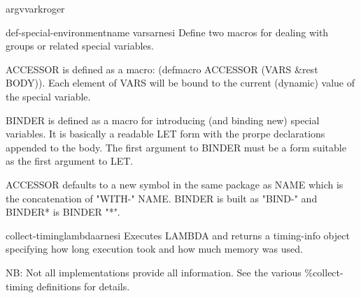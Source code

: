 \begin{function}{argv}{var}{kroger}{}
  
\end{function}

\begin{macro}{def-special-environment}{name \key \rest vars}{arnesi}{}
  Define two macros for dealing with groups or related special variables.

ACCESSOR is defined as a macro: (defmacro ACCESSOR (VARS \&rest
BODY)).  Each element of VARS will be bound to the
current (dynamic) value of the special variable.

BINDER is defined as a macro for introducing (and binding new)
special variables. It is basically a readable LET form with the
prorpe declarations appended to the body. The first argument to
BINDER must be a form suitable as the first argument to LET.

ACCESSOR defaults to a new symbol in the same package as NAME
which is the concatenation of "WITH-" NAME. BINDER is built as
"BIND-" and BINDER* is BINDER "*".
\end{macro}

\begin{function}{collect-timing}{lambda}{arnesi}{}
  Executes LAMBDA and returns a timing-info object specifying
  how long execution took and how much memory was used.

NB: Not all implementations provide all information. See the
various \%collect-timing definitions for details.
\end{function}

